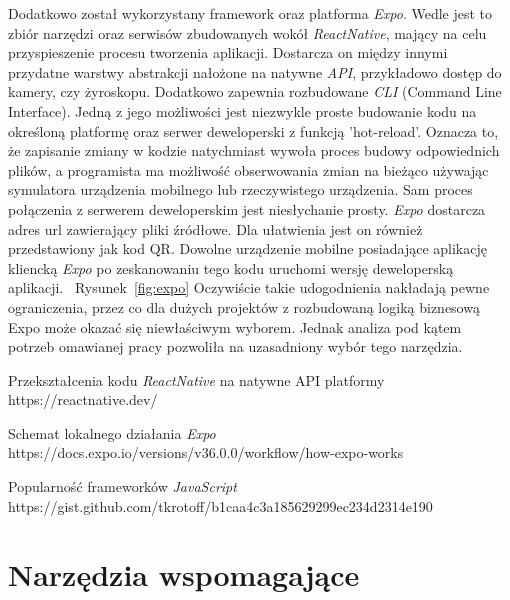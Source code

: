 \documentclass[skorowidz,skroty]{dyplomWEZUT}
\begin{document}
Dodatkowo został wykorzystany framework oraz platforma \textit{Expo}. Wedle \cite{Expo} jest to zbiór narzędzi oraz serwisów zbudowanych wokół \textit{ReactNative}, mający na celu przyspieszenie procesu tworzenia aplikacji. Dostarcza on między innymi przydatne warstwy abstrakcji nałożone na natywne \textit{API}, przykładowo dostęp do kamery, czy żyroskopu. Dodatkowo zapewnia rozbudowane \textit{CLI} (Command Line Interface). Jedną z jego możliwości jest niezwykle proste budowanie kodu na określoną platformę oraz serwer deweloperski z funkcją 'hot-reload'. Oznacza to, że zapisanie zmiany w kodzie natychmiast wywoła proces budowy odpowiednich plików, a programista ma możliwość obserwowania zmian na bieżąco używając symulatora urządzenia mobilnego lub rzeczywistego urządzenia. Sam proces połączenia z serwerem deweloperskim jest niesłychanie prosty. \textit{Expo} dostarcza adres url zawierający pliki źródłowe. Dla ułatwienia jest on również przedstawiony jak kod QR. Dowolne urządzenie mobilne posiadające aplikację kliencką \textit{Expo} po zeskanowaniu tego kodu uruchomi wersję deweloperską aplikacji. ~Rysunek~\ref{fig:expo} Oczywiście takie udogodnienia nakładają pewne ograniczenia, przez co dla dużych projektów z rozbudowaną logiką biznesową Expo może okazać się niewłaściwym wyborem. Jednak analiza pod kątem potrzeb omawianej pracy pozwoliła na uzasadniony wybór tego narzędzia.

{Przekształcenia kodu \textit{ReactNative} na natywne API platformy \label{fig:react-native}}
{https://reactnative.dev/}

{Schemat lokalnego działania \textit{Expo} \label{fig:expo}}
{https://docs.expo.io/versions/v36.0.0/workflow/how-expo-works}

{Popularność frameworków \textit{JavaScript} \label{fig:Frameworks_statictics}}
{https://gist.github.com/tkrotoff/b1caa4c3a185629299ec234d2314e190}

\section{Narzędzia wspomagające}\label{sec: tools}
\end{document}
